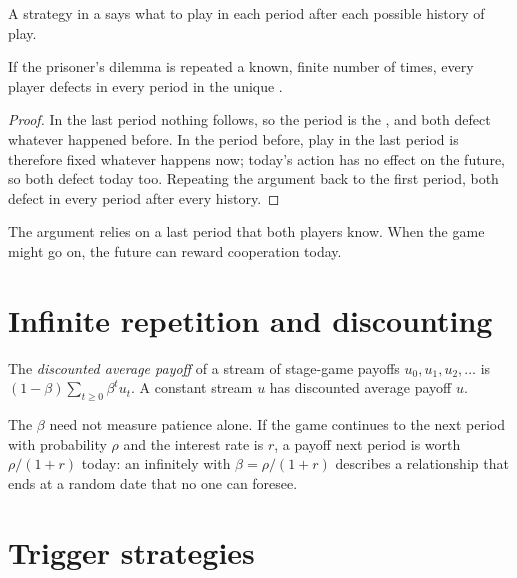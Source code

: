 A strategy in a  says what to play in each period after each possible history of play.

\begin{proposition}[Unravelling]\label{prop:b2:repeated-games:unravelling}
If the prisoner's dilemma is repeated a known, finite number of times, every player defects in every period in
the unique .
\end{proposition}

\begin{proof}
In the last period nothing follows, so the period is the , and both defect whatever happened before.
In the period before, play in the last period is therefore fixed whatever happens now; today's action has no
effect on the future, so both defect today too. Repeating the argument back to the first period, both defect in
every period after every history.
\end{proof}

The argument relies on a last period that both players know. When the game might go on, the future can
reward cooperation today.

\section{Infinite repetition and discounting}\label{sec:b2:repeated-games:infinite}

\begin{definition}\label{def:b2:repeated-games:average-payoff}
The \emph{discounted average payoff} of a stream of stage-game payoffs $u_0,
u_1, u_2, \dots$ is $(1 - \beta)\sum_{t \ge 0} \beta^t u_t$. A constant stream $u$ has discounted average payoff $u$.
\end{definition}

The  $\beta$ need not measure patience alone. If the game continues to the next period with
probability $\rho$ and the interest rate is $r$, a payoff next period is worth $\rho/(1 + r)$ today: an infinitely 
with $\beta = \rho/(1 + r)$ describes a relationship that ends at a random date that no one can foresee.

\section{Trigger strategies}\label{sec:b2:repeated-games:trigger}

